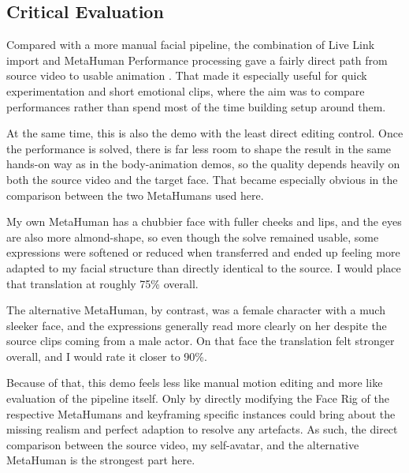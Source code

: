 \subsection{Critical Evaluation}

Compared with a more manual facial pipeline, the combination of Live Link import and MetaHuman Performance processing gave a fairly direct path from source video to usable animation \cite{epic_live_link,epic_metahuman_performance}. That made it especially useful for quick experimentation and short emotional clips, where the aim was to compare performances rather than spend most of the time building setup around them.

At the same time, this is also the demo with the least direct editing control. Once the performance is solved, there is far less room to shape the result in the same hands-on way as in the body-animation demos, so the quality depends heavily on both the source video and the target face. That became especially obvious in the comparison between the two MetaHumans used here. 

My own MetaHuman has a chubbier face with fuller cheeks and lips, and the eyes are also more almond-shape, so even though the solve remained usable, some expressions were softened or reduced when transferred and ended up feeling more adapted to my facial structure than directly identical to the source. I would place that translation at roughly 75\% overall. 

The alternative MetaHuman, by contrast, was a female character with a much sleeker face, and the expressions generally read more clearly on her despite the source clips coming from a male actor. On that face the translation felt stronger overall, and I would rate it closer to 90\%.

Because of that, this demo feels less like manual motion editing and more like evaluation of the pipeline itself. Only by directly modifying the Face Rig of the respective MetaHumans and keyframing specific instances could bring about the missing realism and perfect adaption to resolve any artefacts. As such, the direct comparison between the source video, my self-avatar, and the alternative MetaHuman is the strongest part here.
